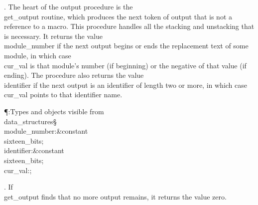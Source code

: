 . The heart of the output procedure is the \\{get\_output} routine, which
produces the next token of output that is not a reference to a macro. This
procedure handles all the stacking and unstacking that is necessary. It
returns the value \\{module\_number} if the next output begins or ends the
replacement text of some module, in which case \\{cur\_val} is that module's
number (if beginning) or the negative of that value (if ending). The
procedure also returns the value \\{identifier} if the next output is an
identifier of length two or more, in which case \\{cur\_val} points to that
identifier name.

\Y\P\?\4:Types and objects visible from \\{data\_structures}\X\mathrel{+}\S%
\?\6
\\{module\_number}\?:\?\&{constant}\8\\{sixteen\_bits}\?\K{}\?;\6
\\{identifier}\?:\?\&{constant}\8\\{sixteen\_bits}\?\K{}\?;\7
\\{cur\_val}\?:\?;\par
\fi

. If \\{get\_output} finds that no more output remains, it returns the
value
zero.

